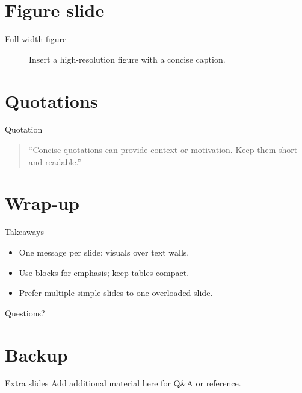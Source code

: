 \documentclass[10pt, aspectratio=169]{beamer}
\begin{document}
\section{Figure slide}
\begin{frame}[t]{Full-width figure}
\begin{figure}
  \centering
  \setlength{\fboxsep}{0pt}%
  \fbox{\rule{0pt}{4cm}\rule{.9\linewidth}{0pt}}
  \caption{Insert a high-resolution figure with a concise caption.}
\end{figure}
\end{frame}

\section{Quotations}
\begin{frame}[t]{Quotation}
\begin{quote}
“Concise quotations can provide context or motivation. Keep them short and readable.”
\end{quote}
\end{frame}

\section{Wrap-up}
\begin{frame}[t]{Takeaways}
\begin{itemize}
  \item One message per slide; visuals over text walls.
  \item Use blocks for emphasis; keep tables compact.
  \item Prefer multiple simple slides to one overloaded slide.
\end{itemize}
\end{frame}

\begin{frame}
  \centering\LARGE Questions?
\end{frame}


\section{Backup}
\begin{frame}[t]{Extra slides}
Add additional material here for Q\&A or reference.
\end{frame}
\end{document}
